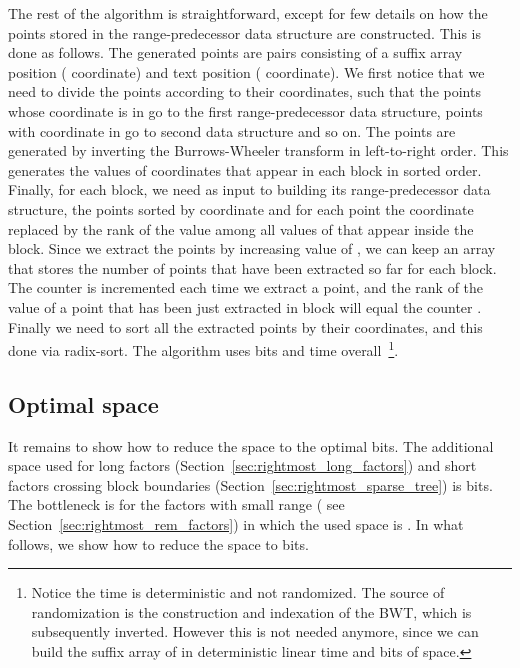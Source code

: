 \documentclass[11pt,runningheads]{llncs}
\begin{document}
{The rest of the algorithm is straightforward, except for 
few details on how the points 
stored in the range-predecessor data structure are constructed. 
This is done as follows. The generated 
points are pairs consisting of a suffix array position ( coordinate)
and text position ( coordinate). 
We first notice that 
we need to divide the points according
to their  coordinates, such that the points
whose  coordinate is in  go to the first range-predecessor 
data structure, points with coordinate in  
go to second data structure and so on. 
The points are generated by inverting the Burrows-Wheeler 
transform in left-to-right order. This generates 
the values of  coordinates that appear in each block in sorted order. 
Finally, for each block, we need as input to building its range-predecessor 
data structure, the 
points sorted by  coordinate and for each point the  coordinate 
replaced by the rank of the value among all values of  that appear 
inside the block. Since we extract the points by increasing value 
of , we can keep an array  that stores the number of points 
that have been extracted so far for each block. The counter is incremented 
each time we extract a point, and the rank of the  value of a point 
that has been just extracted in block  will equal the counter . 
Finally we need to sort all the extracted points by their  coordinates, 
and this done via radix-sort. 
The algorithm uses  bits and  time 
overall~\footnote{Notice the time is deterministic and not randomized.  
The source of randomization is the construction and indexation of the BWT, 
which is subsequently inverted. However this is not needed anymore, since we can 
build the suffix array of  in deterministic linear time and  bits of space.}.

\subsection{Optimal space}
\label{sec:opt_space_rightmost}
It remains to show how to reduce the space to the optimal  bits. 
The additional space used for long factors (Section~\ref{sec:rightmost_long_factors}) 
and short factors crossing block boundaries (Section~\ref{sec:rightmost_sparse_tree}) 
is  bits. The bottleneck is for the factors with small range (
see Section~\ref{sec:rightmost_rem_factors}) in which the used space is 
. In what follows, we show how to reduce the space to 
bits. 

}
\end{document}
